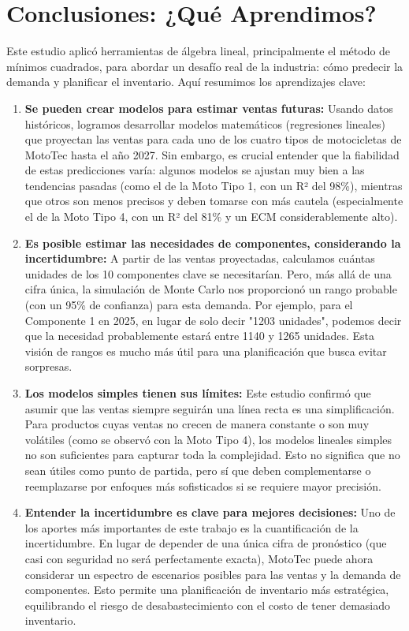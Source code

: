 \documentclass[12pt,a4paper]{article}
\begin{document}
\newpage
\section{Conclusiones: ¿Qué Aprendimos?}
Este estudio aplicó herramientas de álgebra lineal, principalmente el método de mínimos cuadrados, para abordar un desafío real de la industria: cómo predecir la demanda y planificar el inventario. Aquí resumimos los aprendizajes clave:

\begin{enumerate}
    \item \textbf{Se pueden crear modelos para estimar ventas futuras:} Usando datos históricos, logramos desarrollar modelos matemáticos (regresiones lineales) que proyectan las ventas para cada uno de los cuatro tipos de motocicletas de MotoTec hasta el año 2027. Sin embargo, es crucial entender que la fiabilidad de estas predicciones varía: algunos modelos se ajustan muy bien a las tendencias pasadas (como el de la Moto Tipo 1, con un R² del 98\%), mientras que otros son menos precisos y deben tomarse con más cautela (especialmente el de la Moto Tipo 4, con un R² del 81\% y un ECM considerablemente alto).

    \item \textbf{Es posible estimar las necesidades de componentes, considerando la incertidumbre:} A partir de las ventas proyectadas, calculamos cuántas unidades de los 10 componentes clave se necesitarían. Pero, más allá de una cifra única, la simulación de Monte Carlo nos proporcionó un rango probable (con un 95\% de confianza) para esta demanda. Por ejemplo, para el Componente 1 en 2025, en lugar de solo decir "1203 unidades", podemos decir que la necesidad probablemente estará entre 1140 y 1265 unidades. Esta visión de rangos es mucho más útil para una planificación que busca evitar sorpresas.

    \item \textbf{Los modelos simples tienen sus límites:} Este estudio confirmó que asumir que las ventas siempre seguirán una línea recta es una simplificación. Para productos cuyas ventas no crecen de manera constante o son muy volátiles (como se observó con la Moto Tipo 4), los modelos lineales simples no son suficientes para capturar toda la complejidad. Esto no significa que no sean útiles como punto de partida, pero sí que deben complementarse o reemplazarse por enfoques más sofisticados si se requiere mayor precisión.

    \item \textbf{Entender la incertidumbre es clave para mejores decisiones:} Uno de los aportes más importantes de este trabajo es la cuantificación de la incertidumbre. En lugar de depender de una única cifra de pronóstico (que casi con seguridad no será perfectamente exacta), MotoTec puede ahora considerar un espectro de escenarios posibles para las ventas y la demanda de componentes. Esto permite una planificación de inventario más estratégica, equilibrando el riesgo de desabastecimiento con el costo de tener demasiado inventario.
\end{enumerate}
\end{document}

